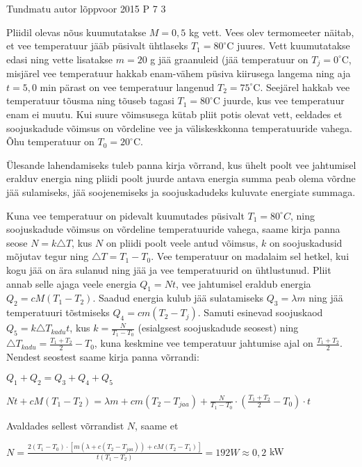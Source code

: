 {Tundmatu autor} %
{lõppvoor} %
{2015} %
{P 7} %
{3} %
{

\ifStatement
Pliidil olevas nõus kuumutatakse $M = 0,5$ kg vett. Vees olev termomeeter näitab, et vee temperatuur jääb püsivalt ühtlaseks $T_1 = 80 ^{\circ}$C juures. Vett kuumutatakse edasi ning vette lisatakse $m = 20$ g jää graanuleid (jää temperatuur on $T_{j} = 0 ^{\circ}$C, misjärel vee temperatuur hakkab enam-vähem püsiva kiirusega langema ning aja $t = 5,0$ min pärast on vee temperatuur langenud $T_2 = 75^{\circ}$C. Seejärel hakkab vee temperatuur tõusma ning tõuseb tagasi $T_1 = 80^{\circ}$C juurde, kus vee temperatuur enam ei muutu. Kui suure võimsusega kütab pliit potis olevat vett, eeldades et soojuskadude võimsus on võrdeline vee ja väliskeskkonna temperatuuride vahega. Õhu temperatuur on $T_0 = 20^{\circ}$C.
\fi

\ifHint
Ülesande lahendamiseks tuleb panna kirja võrrand, kus ühelt poolt vee jahtumisel eralduv energia ning pliidi poolt juurde antava energia summa peab olema võrdne jää sulamiseks, jää soojenemiseks ja soojuskadudeks kuluvate energiate summaga.
\fi

\ifSolution
Kuna vee temperatuur on pidevalt kuumutades püsivalt $T_1 = 80^{\circ}C$, ning soojuskadude võimsus on võrdeline temperatuuride vahega, saame kirja panna seose $N = k\triangle T$, kus $N$ on pliidi poolt veele antud võimsus, $k$ on soojuskadusid mõjutav tegur ning $\triangle T = T_1 - T_0$. Vee temperatuur on madalaim sel hetkel, kui kogu jää on ära sulanud ning jää ja vee temperatuurid on ühtlustunud. Pliit annab selle ajaga veele energia $Q_1 = Nt$, vee jahtumisel eraldub energia $Q_2 = cM (T_1 - T_2)$. Saadud energia kulub jää sulatamiseks $Q_3 = \lambda m$ ning jää temperatuuri tõstmiseks $Q_4 = cm(T_2 - T_j)$. Samuti esinevad soojuskaod $Q_5 = k\triangle T_{kadu}t$, kus $k = \frac{N}{T_1 - T_0}$ (esialgsest soojuskadude seosest) ning $\triangle T_{kadu} = \frac{T_1 + T_2}{2} - T_0$, kuna keskmine vee temperatuur jahtumise ajal on $\frac{T_1 + T_2}{2}$. Nendest seostest saame kirja panna võrrandi: 
\begin{center}
$Q_1 + Q_2 = Q_3 + Q_4 + Q_5$
\end{center}
\begin{center}
$Nt + cM(T_1 - T_2) = \lambda m + cm(T_2 - T_{jaa}) + \frac{N}{T_1 - T_0} \cdot (\frac{T_1 + T_2}{2} - T_0) \cdot t$
\end{center}
Avaldades sellest võrrandist $N$, saame et
\begin{center}
$N = \frac{2(T_1 - T_0) \cdot [m(\lambda + c(T_2 - T_{jaa})) + cM (T_2 - T_1)]}{t(T_1 - T_2)} = 192W \approx 0,2$ kW
\end{center}
\fi
}